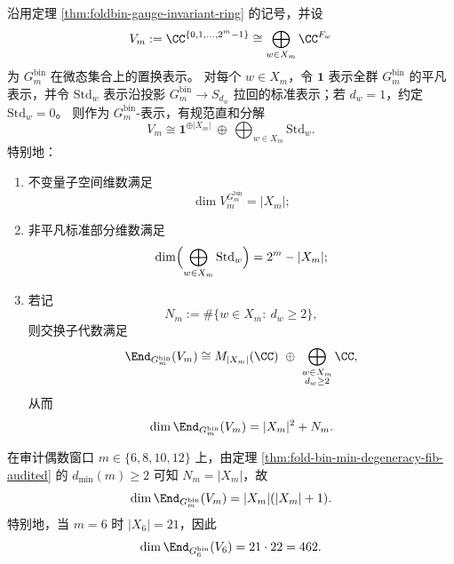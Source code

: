 \begin{theorem}[微态置换表示的纤维规范分裂与交换子代数维数]\label{thm:foldbin-permutation-representation-commutant}
沿用定理 \ref{thm:foldbin-gauge-invariant-ring} 的记号，并设
\[
V_m:=\CC^{\{0,1,\dots,2^m-1\}}
\cong
\bigoplus_{w\in X_m}\CC^{F_w}
\]
为 \(G_m^{\mathrm{bin}}\) 在微态集合上的置换表示。
对每个 \(w\in X_m\)，令 \(\mathbf 1\) 表示全群 \(G_m^{\mathrm{bin}}\) 的平凡表示，并令 \(\mathrm{Std}_w\) 表示沿投影 \(G_m^{\mathrm{bin}}\to S_{d_w}\) 拉回的标准表示；若 \(d_w=1\)，约定 \(\mathrm{Std}_w=0\)。
则作为 \(G_m^{\mathrm{bin}}\)-表示，有规范直和分解
\[
V_m\cong \mathbf 1^{\oplus |X_m|}\ \oplus\ \bigoplus_{w\in X_m}\mathrm{Std}_w.
\]
特别地：
\begin{enumerate}
  \item 不变量子空间维数满足
  \[
  \dim V_m^{G_m^{\mathrm{bin}}}=|X_m|;
  \]
  \item 非平凡标准部分维数满足
  \[
  \dim\Bigl(\bigoplus_{w\in X_m}\mathrm{Std}_w\Bigr)=2^m-|X_m|;
  \]
  \item 若记
  \[
  N_m:=\#\{w\in X_m:\ d_w\ge 2\},
  \]
  则交换子代数满足
  \[
  \End_{G_m^{\mathrm{bin}}}(V_m)
  \cong
  M_{|X_m|}(\CC)\ \oplus\ \bigoplus_{\substack{w\in X_m\\ d_w\ge 2}}\CC,
  \]
  从而
  \begin{equation}\label{eq:foldbin-commutant-dimension}
  \dim \End_{G_m^{\mathrm{bin}}}(V_m)=|X_m|^2+N_m.
  \end{equation}
\end{enumerate}
在审计偶数窗口 \(m\in\{6,8,10,12\}\) 上，由定理 \ref{thm:fold-bin-min-degeneracy-fib-audited} 的 \(d_{\min}(m)\ge 2\) 可知 \(N_m=|X_m|\)，故
\[
\dim \End_{G_m^{\mathrm{bin}}}(V_m)=|X_m|(|X_m|+1).
\]
特别地，当 \(m=6\) 时 \(|X_6|=21\)，因此
\[
\dim \End_{G_6^{\mathrm{bin}}}(V_6)=21\cdot 22=462.
\]
\end{theorem}
